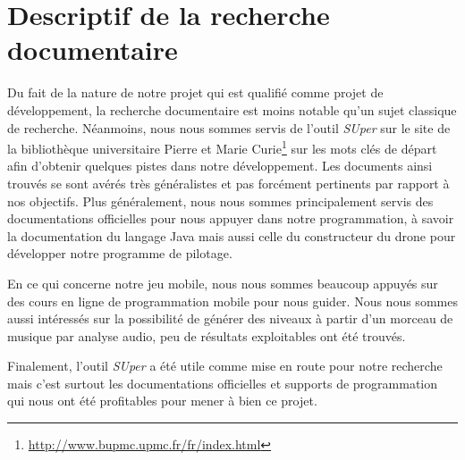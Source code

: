 \section{Descriptif de la recherche documentaire}
Du fait de la nature de notre projet qui est qualifié comme projet de développement, la recherche documentaire est moins notable qu'un sujet classique de recherche. Néanmoins, nous nous sommes servis de l'outil \textit{SUper} sur le site de la bibliothèque universitaire Pierre et Marie Curie\footnote{\url{http://www.bupmc.upmc.fr/fr/index.html}} sur les mots clés de départ afin d'obtenir quelques pistes dans notre développement. Les documents ainsi trouvés se sont avérés très généralistes et pas forcément pertinents par rapport à nos objectifs. Plus généralement, nous nous sommes principalement servis des documentations \og officielles \fg{} pour nous appuyer dans notre programmation, à savoir la documentation du langage Java mais aussi celle du constructeur du drone pour développer notre programme de pilotage.

En ce qui concerne notre jeu mobile, nous nous sommes beaucoup appuyés sur des cours en ligne de programmation mobile \android{} pour nous guider. Nous nous sommes aussi intéressés sur la possibilité de générer des niveaux à partir d'un morceau de musique par analyse audio, peu de résultats exploitables ont été trouvés.

Finalement, l'outil \textit{SUper} a été utile comme mise en route pour notre recherche mais c'est surtout les documentations officielles et supports de programmation qui nous ont été profitables pour mener à bien ce projet.